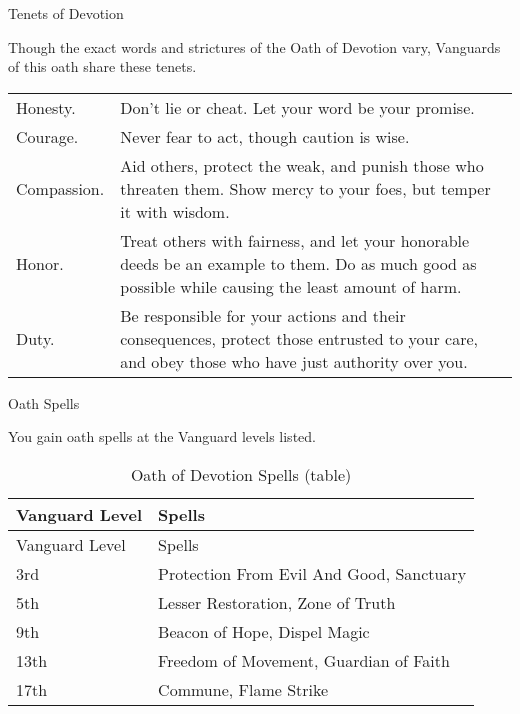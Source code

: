 Tenets of Devotion

Though the exact words and strictures of the Oath of Devotion vary,
Vanguards of this oath share these tenets.

\begin{longtable}[]{@{}
  >{\raggedright\arraybackslash}p{}
  >{\raggedright\arraybackslash}p{}@{}}
\toprule\noalign{}
\endhead
\bottomrule\noalign{}
\endlastfoot
Honesty. & Don't lie or cheat. Let your word be your promise. \\
Courage. & Never fear to act, though caution is wise. \\
Compassion. & Aid others, protect the weak, and punish those who
threaten them. Show mercy to your foes, but temper it with wisdom. \\
Honor. & Treat others with fairness, and let your honorable deeds be an
example to them. Do as much good as possible while causing the least
amount of harm. \\
Duty. & Be responsible for your actions and their consequences, protect
those entrusted to your care, and obey those who have just authority
over you. \\
\end{longtable}

Oath Spells

You gain oath spells at the Vanguard levels listed.

\begin{longtable}[]{@{}
  >{\raggedright\arraybackslash}p{}
  >{\raggedright\arraybackslash}p{}@{}}
\caption{Oath of Devotion Spells
(table)}\label{vanguard-oath-of-devotion-spells}\tabularnewline
\toprule\noalign{}
\begin{minipage}[b]{\linewidth}\raggedright
Vanguard Level
\end{minipage} & \begin{minipage}[b]{\linewidth}\raggedright
Spells
\end{minipage} \\
\midrule\noalign{}
\endfirsthead
\toprule\noalign{}
\begin{minipage}[b]{\linewidth}\raggedright
Vanguard Level
\end{minipage} & \begin{minipage}[b]{\linewidth}\raggedright
Spells
\end{minipage} \\
\midrule\noalign{}
\endhead
\bottomrule\noalign{}
\endlastfoot
3rd & Protection From Evil And Good, Sanctuary \\
5th & Lesser Restoration, Zone of Truth \\
9th & Beacon of Hope, Dispel Magic \\
13th & Freedom of Movement, Guardian of Faith \\
17th & Commune, Flame Strike \\
\end{longtable}

